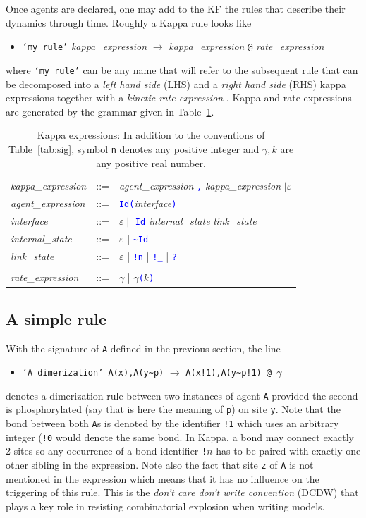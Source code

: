 \documentclass[11pt]{book}
\def\int{\hbox{\texttt{\~}}}
\def\tcb#1{\textcolor{blue}{\ttt{#1}}}
\def\ttt#1{\texttt{#1}}
\def\rar{\rightarrow}
\def\ga{\gamma}
\def\ITE#1{\begin{itemize}#1\end{itemize}}
\begin{document}
Once agents are declared, one may add to the KF the rules that describe their dynamics through time. Roughly a Kappa rule looks like 
\ITE{
\item[] \ttt{`my rule'} {\it kappa\_expression} $\rar$ {\it kappa\_expression} \ttt{@} {\it rate\_expression}  
}
where \ttt{`my rule'} can be any name that will refer to the subsequent rule that can be decomposed into a \emph{left hand side} (LHS) and a \emph{right hand side} (RHS) kappa expressions together with a \emph{kinetic rate expression} . Kappa and rate expressions are generated by the grammar given in Table~\ref{tab:patterns}.
\begin{table}[htbp]
  \centering
  \begin{tabular}{@{} lcl @{}}
    \textit{kappa\_expression} & ::= & \textit{agent\_expression} \tcb{,} \textit{kappa\_expression} $\mid\varepsilon$ \\ 
    \textit{agent\_expression} & ::= &  \tcb{Id}\tcb{(}\textit{interface}\tcb{)} \\
    \textit{interface} &::=& $\varepsilon\mid$ \tcb{Id} \textit{internal\_state link\_state}\\
    \textit{internal\_state} &::=& $\varepsilon$ | \tcb{\int Id} \\
    \textit{link\_state} &::=& $\varepsilon$ | \tcb{!n} | \tcb{!\_} | \tcb{?}  \\\\
    \textit{rate\_expression} &::=& $\ga$ | $\ga$\tcb{(}$k$\tcb{)} 
    \end{tabular}
  \caption{Kappa expressions: In addition to the conventions of Table~\ref{tab:sig}, symbol \ttt{n} denotes any positive integer and $\ga,k$ are any positive real number.}
  \label{tab:patterns}
\end{table}
\subsection{A simple rule}
With the signature of \ttt{A} defined in the previous section, the line
\ITE{
\item[] \ttt{`A dimerization' A(x),A(y\int p)} $\rar$ \ttt{A(x!1),A(y\int p!1) @ $\ga$} 
}
denotes a dimerization rule between two instances of agent \ttt{A} provided the second is phosphorylated (say that is here the meaning of \ttt{p}) on site \ttt{y}. Note that the bond between both \ttt{A}s is denoted by the identifier \ttt{!1} which uses an arbitrary integer (\ttt{!0} would denote the same bond. In Kappa, a bond may connect exactly 2 sites so any occurrence of a bond identifier \ttt{!}$n$ has to be paired with exactly one other sibling in the expression. Note also the fact that site \ttt{z} of \ttt{A} is not mentioned in the expression which means that it has no influence on the triggering of this rule. This is the \emph{don't care don't write convention} (DCDW)  that plays a key role in resisting combinatorial explosion when writing models.
\end{document}
